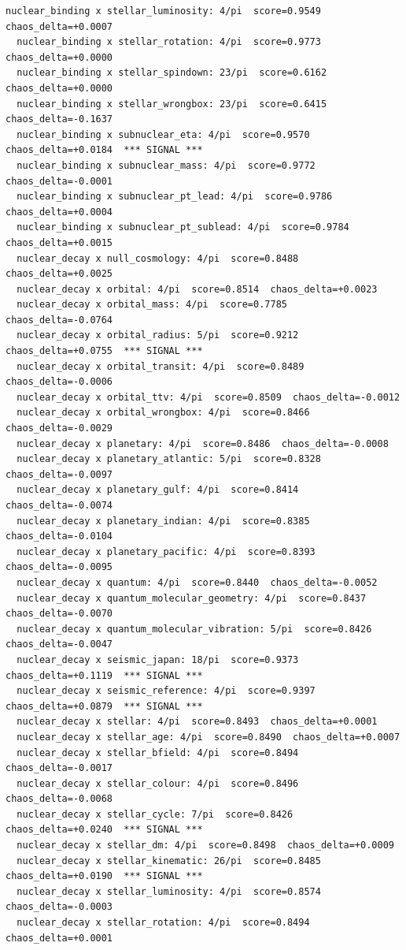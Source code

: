 \documentclass[11pt, letterpaper, openany]{book}
\begin{document}
\begin{empiricalbox}
\begin{lstlisting}[style=terminal]
  nuclear_binding x stellar_luminosity: 4/pi  score=0.9549  chaos_delta=+0.0007
  nuclear_binding x stellar_rotation: 4/pi  score=0.9773  chaos_delta=+0.0000
  nuclear_binding x stellar_spindown: 23/pi  score=0.6162  chaos_delta=+0.0000
  nuclear_binding x stellar_wrongbox: 23/pi  score=0.6415  chaos_delta=-0.1637
  nuclear_binding x subnuclear_eta: 4/pi  score=0.9570  chaos_delta=+0.0184  *** SIGNAL ***
  nuclear_binding x subnuclear_mass: 4/pi  score=0.9772  chaos_delta=-0.0001
  nuclear_binding x subnuclear_pt_lead: 4/pi  score=0.9786  chaos_delta=+0.0004
  nuclear_binding x subnuclear_pt_sublead: 4/pi  score=0.9784  chaos_delta=+0.0015
  nuclear_decay x null_cosmology: 4/pi  score=0.8488  chaos_delta=+0.0025
  nuclear_decay x orbital: 4/pi  score=0.8514  chaos_delta=+0.0023
  nuclear_decay x orbital_mass: 4/pi  score=0.7785  chaos_delta=-0.0764
  nuclear_decay x orbital_radius: 5/pi  score=0.9212  chaos_delta=+0.0755  *** SIGNAL ***
  nuclear_decay x orbital_transit: 4/pi  score=0.8489  chaos_delta=-0.0006
  nuclear_decay x orbital_ttv: 4/pi  score=0.8509  chaos_delta=-0.0012
  nuclear_decay x orbital_wrongbox: 4/pi  score=0.8466  chaos_delta=-0.0029
  nuclear_decay x planetary: 4/pi  score=0.8486  chaos_delta=-0.0008
  nuclear_decay x planetary_atlantic: 5/pi  score=0.8328  chaos_delta=-0.0097
  nuclear_decay x planetary_gulf: 4/pi  score=0.8414  chaos_delta=-0.0074
  nuclear_decay x planetary_indian: 4/pi  score=0.8385  chaos_delta=-0.0104
  nuclear_decay x planetary_pacific: 4/pi  score=0.8393  chaos_delta=-0.0095
  nuclear_decay x quantum: 4/pi  score=0.8440  chaos_delta=-0.0052
  nuclear_decay x quantum_molecular_geometry: 4/pi  score=0.8437  chaos_delta=-0.0070
  nuclear_decay x quantum_molecular_vibration: 5/pi  score=0.8426  chaos_delta=-0.0047
  nuclear_decay x seismic_japan: 18/pi  score=0.9373  chaos_delta=+0.1119  *** SIGNAL ***
  nuclear_decay x seismic_reference: 4/pi  score=0.9397  chaos_delta=+0.0879  *** SIGNAL ***
  nuclear_decay x stellar: 4/pi  score=0.8493  chaos_delta=+0.0001
  nuclear_decay x stellar_age: 4/pi  score=0.8490  chaos_delta=+0.0007
  nuclear_decay x stellar_bfield: 4/pi  score=0.8494  chaos_delta=-0.0017
  nuclear_decay x stellar_colour: 4/pi  score=0.8496  chaos_delta=-0.0068
  nuclear_decay x stellar_cycle: 7/pi  score=0.8426  chaos_delta=+0.0240  *** SIGNAL ***
  nuclear_decay x stellar_dm: 4/pi  score=0.8498  chaos_delta=+0.0009
  nuclear_decay x stellar_kinematic: 26/pi  score=0.8485  chaos_delta=+0.0190  *** SIGNAL ***
  nuclear_decay x stellar_luminosity: 4/pi  score=0.8574  chaos_delta=-0.0003
  nuclear_decay x stellar_rotation: 4/pi  score=0.8494  chaos_delta=+0.0001

\end{lstlisting}
\end{empiricalbox}
\end{document}
